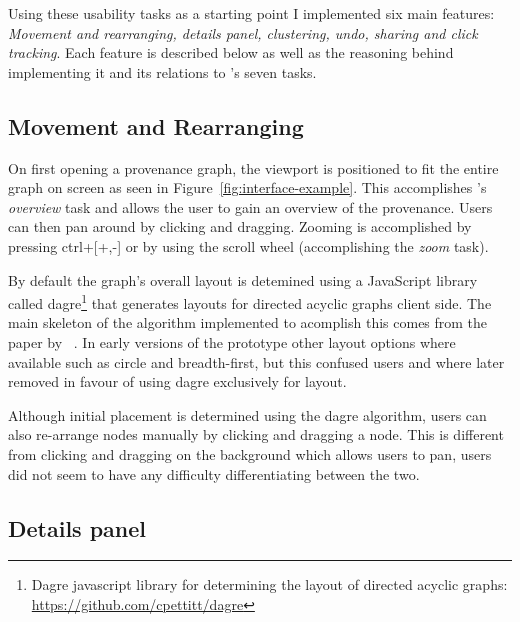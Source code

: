 Using these usability tasks as a starting point I implemented six main features: \textit{Movement and rearranging, details panel, clustering, undo, sharing and click tracking}. Each feature is described below as well as the reasoning behind implementing it and its relations to \citeauthor{Shneiderman1996}'s seven tasks. 

\subsection{Movement and Rearranging}
\label{sec:movement_and_rearranging}

On first opening a provenance graph, the viewport is positioned to fit the entire graph on screen as seen in Figure~\ref{fig:interface-example}. This accomplishes \citeauthor{Shneiderman1996}'s \textit{overview} task and allows the user to gain an overview of the provenance. Users can then pan around by clicking and dragging. Zooming is accomplished by pressing ctrl+[+,-] or by using the scroll wheel (accomplishing the \textit{zoom} task). 

By default the graph's overall layout is detemined using a JavaScript library called dagre\footnote{Dagre javascript library for determining the layout of directed acyclic graphs: \url{https://github.com/cpettitt/dagre}} that generates layouts for directed acyclic graphs client side. The main skeleton of the algorithm implemented to acomplish this comes from the paper  by \citeauthor{Gansner1993}~\cite{Gansner1993}. In early versions of the prototype other layout options where available such as circle and breadth-first, but this confused users and where later removed in favour of using dagre exclusively for layout.

Although initial placement is determined using the dagre algorithm, users can also re-arrange nodes manually by clicking and dragging a node. This is different from clicking and dragging on the background which allows users to pan, users did not seem to have any difficulty differentiating between the two.

\subsection{Details panel}
\label{sec:details_on_demand}

